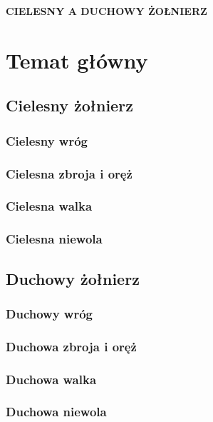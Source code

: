 \documentclass[10pt,a4paper,oneside]{article}
\begin{document}
\centerline{\textbf{\MakeUppercase{Cielesny a duchowy żołnierz}}}

\section{Temat główny}
\subsection{Cielesny żołnierz}
\subsubsection{Cielesny wróg}
\subsubsection{Cielesna zbroja i oręż}
\subsubsection{Cielesna walka}
\subsubsection{Cielesna niewola}
\subsection{Duchowy żołnierz}
\subsubsection{Duchowy wróg}
\subsubsection{Duchowa zbroja i oręż}
\subsubsection{Duchowa walka}
\subsubsection{Duchowa niewola}
\end{document}
